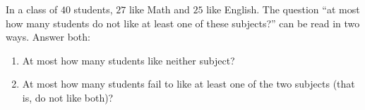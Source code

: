 In a class of $40$ students, $27$ like Math and $25$ like English. The question ``at most how many students do not like at least one of these subjects?'' can be read in two ways. Answer both:
\begin{enumerate}
\item[(a)] At most how many students like neither subject?
\item[(b)] At most how many students fail to like at least one of the two subjects (that is, do not like both)?
\end{enumerate}
